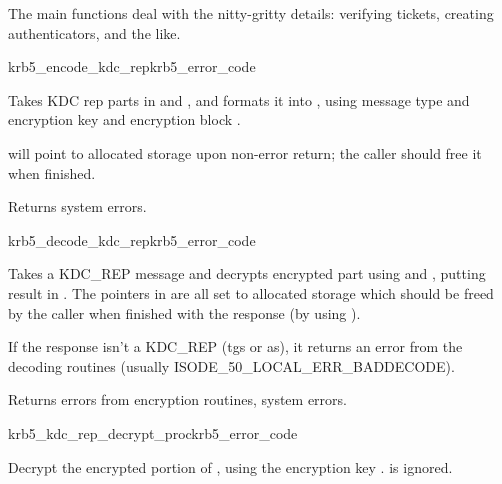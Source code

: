 The main functions deal with the nitty-gritty details: verifying
tickets, creating authenticators, and the like.

\begin{funcdecl}{krb5_encode_kdc_rep}{krb5_error_code}{\funcin}
\funcinout
{}
\funcout
{}
\end{funcdecl}

\internalfunc

Takes KDC rep parts in  and , and
formats it into , using message type
 and encryption key  and
encryption block .

 will point to  allocated storage upon
non-error return; the caller should free it when finished.

Returns system errors.

\begin{funcdecl}{krb5_decode_kdc_rep}{krb5_error_code}{\funcin}
\funcout
{}
\end{funcdecl}

\internalfunc

Takes a KDC_REP message and decrypts encrypted part using
 and , putting result in .
The pointers in 
are all set to allocated storage which should be freed by the caller
when finished with the response (by using ).


If the response isn't a KDC_REP (tgs or as), it returns an error from
the decoding routines (usually ISODE_50_LOCAL_ERR_BADDECODE).

Returns errors from encryption routines, system errors.

\begin{funcdecl}{krb5_kdc_rep_decrypt_proc}{krb5_error_code}{\funcin}
\funcinout
{}
\end{funcdecl}

Decrypt the encrypted portion of , using the
encryption key .   is ignored.

